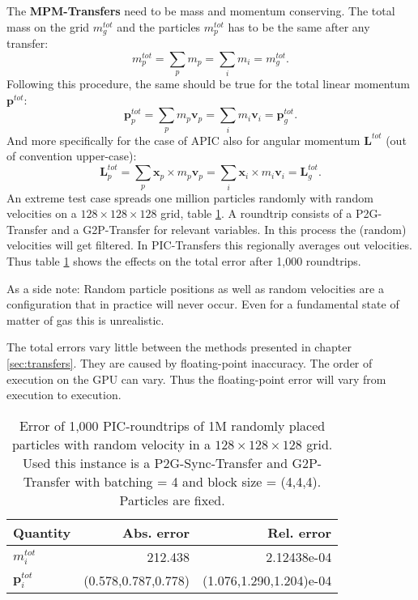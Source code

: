 \documentclass[m,times]{cgMA}
\begin{document}
The \textbf{MPM-Transfers} need to be mass and momentum conserving. The total mass on the grid $m_g^{tot}$ and the particles $m_p^{tot}$ has to be the same after any transfer:
\begin{equation}
  m_{p}^{tot}= \sum_p m_p =  \sum_i m_i = m_{g}^{tot}.
\end{equation}
Following this procedure, the same should be true for the total linear momentum $\boldsymbol{p}^{tot}$:
\begin{equation}
  \boldsymbol{p}_{p}^{tot}= \sum_p m_p \boldsymbol{v}_p=  \sum_i m_i \boldsymbol{v}_i = \boldsymbol{p}_{g}^{tot}.
\end{equation}
And more specifically for the case of APIC also for angular momentum $\boldsymbol{L}^{tot}$ (out of convention upper-case):
\begin{equation}
  \boldsymbol{L}_{p}^{tot}= \sum_p \boldsymbol{x}_p \times m_p \boldsymbol{v}_p =  \sum_i \boldsymbol{x}_i \times m_i \boldsymbol{v}_i = \boldsymbol{L}_{g}^{tot}.
\end{equation}
An extreme test case spreads one million particles randomly with random velocities on a $128\times128\times128$ grid, table \ref{tab:roundtrip}. A roundtrip consists of a P2G-Transfer and a G2P-Transfer for relevant variables. In this process the (random) velocities will get filtered. In PIC-Transfers this regionally averages out velocities. Thus table \ref{tab:roundtrip} shows the effects on the total error after 1,000 roundtrips.

As a side note: Random particle positions as well as random velocities are a configuration that in practice will never occur. Even for a fundamental state of matter of gas this is unrealistic.

The total errors vary little between the methods presented in chapter \ref{sec:transfers}. They are caused by floating-point inaccuracy. The order of execution on the GPU can vary. Thus the floating-point error will vary from execution to execution.
\begin{table}[t]
\centering
  \begin{tabular}{|l|r|r|}\hline
    Quantity& Abs. error  & Rel. error \\ \hline
    $m^{tot}_i$ & 212.438     & 2.12438e-04     \\\hline
    $\boldsymbol{p}^{tot}_i$ & (0.578,0.787,0.778)&(1.076,1.290,1.204)e-04 \\\hline
   \end{tabular}
   \caption{Error of 1,000 PIC-roundtrips of 1M randomly placed particles with random velocity in a $128\times128\times128$ grid. Used this instance is a P2G-Sync-Transfer and G2P-Transfer with batching = 4 and block size = (4,4,4). Particles are fixed.}
  \label{tab:roundtrip}
\end{table}
\end{document}
